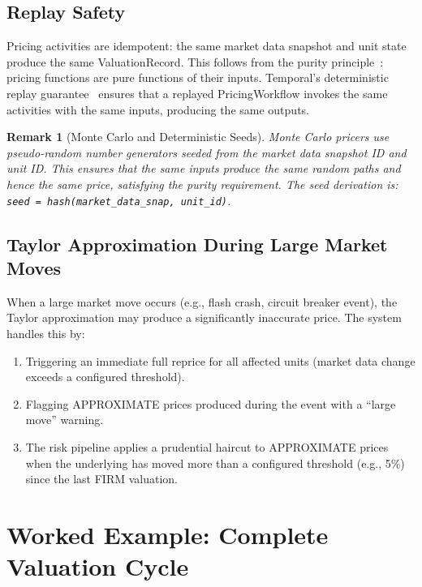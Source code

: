 \documentclass[11pt,a4paper]{article}
\newtheorem{remark}[definition]{Remark}
\begin{document}
\subsection{Replay Safety}

Pricing activities are idempotent: the same market data snapshot and unit state produce the same ValuationRecord.  This follows from the purity principle~\cite[\S7.7]{ledger}: pricing functions are pure functions of their inputs.  Temporal's deterministic replay guarantee~\cite[\S14.1]{ledger} ensures that a replayed PricingWorkflow invokes the same activities with the same inputs, producing the same outputs.

\begin{remark}[Monte Carlo and Deterministic Seeds]
Monte Carlo pricers use pseudo-random number generators seeded from the market data snapshot ID and unit ID.  This ensures that the same inputs produce the same random paths and hence the same price, satisfying the purity requirement.  The seed derivation is: \texttt{seed = hash(market\_data\_snap, unit\_id)}.
\end{remark}

\subsection{Taylor Approximation During Large Market Moves}

When a large market move occurs (e.g., flash crash, circuit breaker event), the Taylor approximation may produce a significantly inaccurate price.  The system handles this by:
\begin{enumerate}[nosep]
\item Triggering an immediate full reprice for all affected units (market data change exceeds a configured threshold).
\item Flagging APPROXIMATE prices produced during the event with a ``large move'' warning.
\item The risk pipeline applies a prudential haircut to APPROXIMATE prices when the underlying has moved more than a configured threshold (e.g., 5\%) since the last FIRM valuation.
\end{enumerate}

\clearpage
\section{Worked Example: Complete Valuation Cycle}
\label{sec:worked-example}
\end{document}
